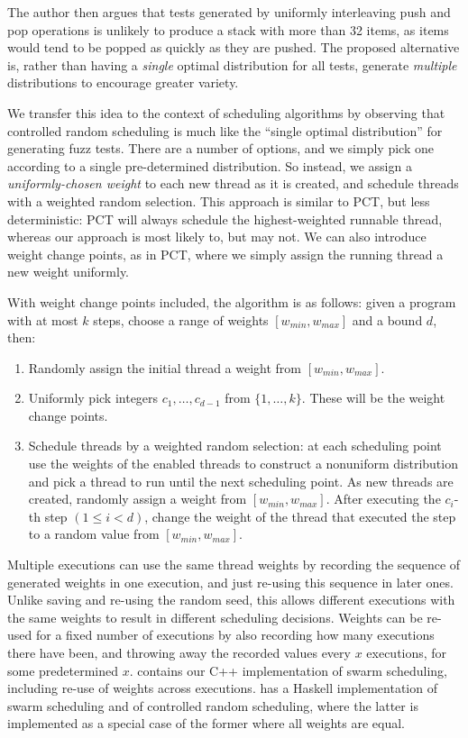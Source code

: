 The author then argues that tests generated by uniformly interleaving push and
pop operations is unlikely to produce a stack with more than 32 items, as items
would tend to be popped as quickly as they are pushed.  The proposed alternative
is, rather than having a \emph{single} optimal distribution for all tests,
generate \emph{multiple} distributions to encourage greater variety.

We transfer this idea to the context of scheduling algorithms by observing that
controlled random scheduling is much like the ``single optimal distribution''
for generating fuzz tests.  There are a number of options, and we simply pick
one according to a single pre-determined distribution.  So instead, we assign
a \emph{uniformly-chosen weight} to each new thread as it is created, and
schedule threads with a weighted random selection.  This approach is similar to
PCT, but less deterministic: PCT will always schedule the highest-weighted
runnable thread, whereas our approach is most likely to, but may not.  We can
also introduce weight change points, as in PCT, where we simply assign the
running thread a new weight uniformly.

With weight change points included, the algorithm is as follows: given a program
with at most $k$ steps, choose a range of weights $[w_{min}, w_{max}]$ and
a bound $d$, then:

\begin{enumerate}
\item Randomly assign the initial thread a weight from $[w_{min}, w_{max}]$.
\item Uniformly pick integers $c_1, \ldots, c_{d-1}$ from $\{1, \ldots, k\}$.
These will be the weight change points.
\item Schedule threads by a weighted random selection: at each scheduling point
use the weights of the enabled threads to construct a nonuniform distribution
and pick a thread to run until the next scheduling point.  As new threads are
created, randomly assign a weight from $[w_{min}, w_{max}]$.  After executing
the $c_i$-th step $(1 \leq i < d)$, change the weight of the thread that
executed the step to a random value from $[w_{min}, w_{max}]$.
\end{enumerate}

Multiple executions can use the same thread weights by recording the sequence of
generated weights in one execution, and just re-using this sequence in later
ones.  Unlike saving and re-using the random seed, this allows different
executions with the same weights to result in different scheduling decisions.
Weights can be re-used for a fixed number of executions by also recording how
many executions there have been, and throwing away the recorded values every $x$
executions, for some predetermined $x$.   contains our C++
implementation of swarm scheduling, including re-use of weights across
executions.  \dejafu{} has a Haskell implementation of swarm scheduling and of
controlled random scheduling, where the latter is implemented as a special case
of the former where all weights are equal.

